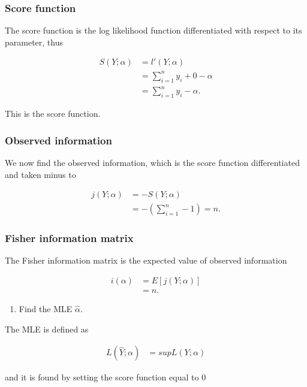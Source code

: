 \subsubsection{Score function}

The score function is the log likelihood function differentiated with respect to its parameter, thus

\begin{align*}
    S\left( Y; \alpha \right) &= l'(Y; \alpha)\\
    &= \sum_{i=1}^n y_i + 0 - \alpha\\
    &= \sum_{i=1}^n y_i - \alpha.
\end{align*}

This is the score function. 

\subsubsection{Observed information}

We now find the observed information, which is the score function differentiated and taken minus to

\begin{align*}
    j\left( Y; \alpha \right) &= - S\left(Y; \alpha \right)\\
    &=  - \left( \sum_{i = 1}^n -1\right) = n.
\end{align*}

\subsubsection{Fisher information matrix}

The Fisher information matrix is the expected value of observed information

\begin{align*}
    i\left(\alpha \right) &= E\left[j(Y;\alpha)\right]\\
    &= n.
\end{align*}

\begin{enumerate}[resume]
    \item  Find the MLE $\hat{\alpha}$.
\end{enumerate}

The MLE is defined as

\begin{align*}
    L(\hat{Y}; \alpha) &= sup L(Y; \alpha)
\end{align*}

and it is found by setting the score function equal to $0$


